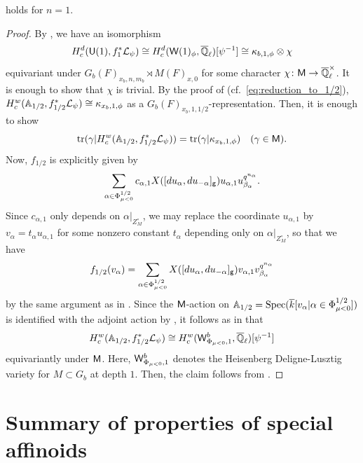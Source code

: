 \documentclass[12pt,reqno]{amsart}
\begin{document}
\begin{prop} \label{prop:cohomology_reduction_n=1}
     holds for $n = 1$. 
\end{prop}
\begin{proof}
    By , we have an isomorphism
    \[
        H_c^d({\mathsf{U}}(1), f_1^*{\mathcal{L}}_{\psi}) \cong H_c^d({\mathsf{W}}(1)_\phi, {\overline{\mathbb{Q}}_\ell})[\psi^{-1}] \cong \kappa_{b, 1, \phi} \otimes \chi 
    \]
    equivariant under $G_b(F)_{x_b, n, m_b} \rtimes M(F)_{x, 0}$ for some character $\chi \colon {\mathsf{M}} \to {\overline{\mathbb{Q}}_\ell^\times}$. It is enough to show that $\chi$ is trivial. By the proof of  (cf.\ \eqref{eq:reduction_to_1/2}), $H_c^w(\mathbb{A}_{1/2}, f_{1/2}^* {\mathcal{L}}_\psi) \cong \kappa_{x_b, 1, \phi}$ as a $G_b(F)_{x_b, 1, 1/2}$-representation. Then, it is enough to show 
    \[
        {\operatorname{tr}}(\gamma\vert H_c^w(\mathbb{A}_{1/2}, f_{1/2}^* {\mathcal{L}}_\psi)) = {\operatorname{tr}}(\gamma \vert \kappa_{x_b, 1, \phi}) \quad (\gamma \in {\mathsf{M}}).
    \]
    Now, $f_{1 /2}$ is explicitly given by 
    \[
        \sum_{\alpha \in \Phi_{\mu < 0}^{1/2}} c_{\alpha, 1} X([du_\alpha, du_{-\alpha}]_{{\mathsf{g}}}) u_{\alpha, 1} u_{\beta_\alpha}^{q^{n_\alpha}}. 
    \]
    Since $c_{\alpha, 1}$ only depends on $\alpha\vert_{Z_{M}^\circ}$, we may replace the coordinate $u_{\alpha, 1}$ by $v_\alpha = t_\alpha u_{\alpha, 1}$ for some nonzero constant $t_\alpha$ depending only on $\alpha\vert_{Z_M^\circ}$, so that we have
    \[
        f_{1/2}(v_\alpha) = \sum_{\alpha \in \Phi_{\mu < 0}^{1/2}} X([du_\alpha, du_{-\alpha}]_{{\mathsf{g}}}) v_{\alpha, 1} v_{\beta_\alpha}^{q^{n_\alpha}}
    \]
    by the same argument as in . Since the ${\mathsf{M}}$-action on $\mathbb{A}_{1/2} = {\operatorname{Spec}}({\overline{k}}[v_\alpha \vert \alpha \in \Phi^{1/2}_{\mu < 0}])$ is identified with the adjoint action by , it follows as in  that 
    \[
        H_c^w(\mathbb{A}_{1/2}, f_{1/2}^* {\mathcal{L}}_\psi) \cong H_c^w({\mathsf{W}}^b_{\Phi_{\mu < 0}, 1}, {\overline{\mathbb{Q}}_\ell})[\psi^{-1}]
    \]
    equivariantly under ${\mathsf{M}}$. Here, ${\mathsf{W}}^b_{\Phi_{\mu < 0}, 1}$ denotes the Heisenberg Deligne-Lusztig variety for $M \subset G_b$ at depth $1$. Then, the claim follows from \cite[Theorem 6]{Tak26_Yu}. 
\end{proof}


\section{Summary of properties of special affinoids} \label{sec:summary}
\end{document}
